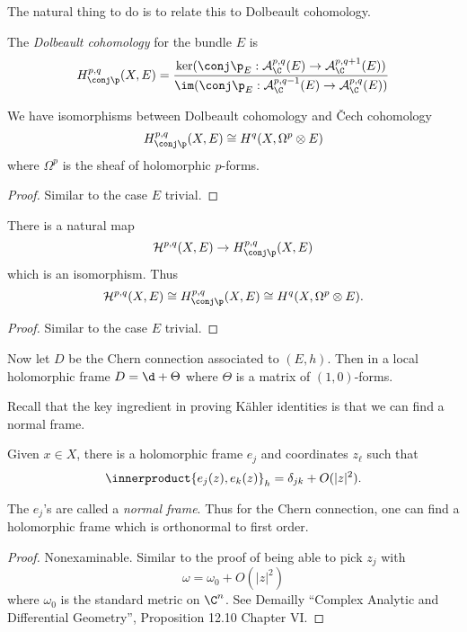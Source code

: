 \documentclass[a4paper]{article}
\newcommand*{\ip}{\innerproduct}
\begin{document}
The natural thing to do is to relate this to Dolbeault cohomology.

\begin{definition}
  The \emph{Dolbeault cohomology} for the bundle \(E\) is
  \[
    H^{p, q}_{\conj \p}(X, E)
    = \frac{\ker (\conj \p_E: \mathcal A^{p, q}_\C(E) \to \mathcal A^{p, q + 1}_\C(E))} {\im (\conj \p_E: \mathcal A^{p, q - 1}_\C(E) \to \mathcal A^{p, q}_\C(E))}
  \]
\end{definition}

\begin{theorem}
  We have isomorphisms between Dolbeault cohomology and Čech cohomology
  \[
    H^{p, q}_{\conj \p}(X, E) \cong H^q(X, \Omega^p \otimes E)
  \]
  where \(\Omega^p\) is the sheaf of holomorphic \(p\)-forms.
\end{theorem}

\begin{proof}
  Similar to the case \(E\) trivial.
\end{proof}

\begin{lemma}
  There is a natural map
  \[
    \mathcal H^{p, q}(X, E) \to H^{p, q}_{\conj \p}(X, E)
  \]
  which is an isomorphism. Thus
  \[
    \mathcal H^{p, q}(X, E) \cong H^{p, q}_{\conj \p}(X, E) \cong H^q(X, \Omega^p \otimes E).
  \]
\end{lemma}

\begin{proof}
  Similar to the case \(E\) trivial.
\end{proof}

Now let \(D\) be the Chern connection associated to \((E, h)\). Then in a local holomorphic frame \(D = \d + \Theta\) where \(\Theta\) is a matrix of \((1, 0)\)-forms.

Recall that the key ingredient in proving Kähler identities is that we can find a normal frame.
\begin{proposition}
  Given \(x \in X\), there is a holomorphic frame \(e_j\) and coordinates \(z_\ell\) such that
  \[
    \ip{e_j(z), e_k(z)}_h = \delta_{jk} + O(|z|^2).
  \]
\end{proposition}
The \(e_j\)'s are called a \emph{normal frame}. Thus for the Chern connection, one can find a holomorphic frame which is orthonormal to first order.

\begin{proof}
  Nonexaminable. Similar to the proof of being able to pick \(z_j\) with
  \[
    \omega = \omega_0 + O(|z|^2)
  \]
  where \(\omega_0\) is the standard metric on \(\C^n\). See Demailly ``Complex Analytic and Differential Geometry'', Proposition 12.10 Chapter VI.
\end{proof}
\end{document}
